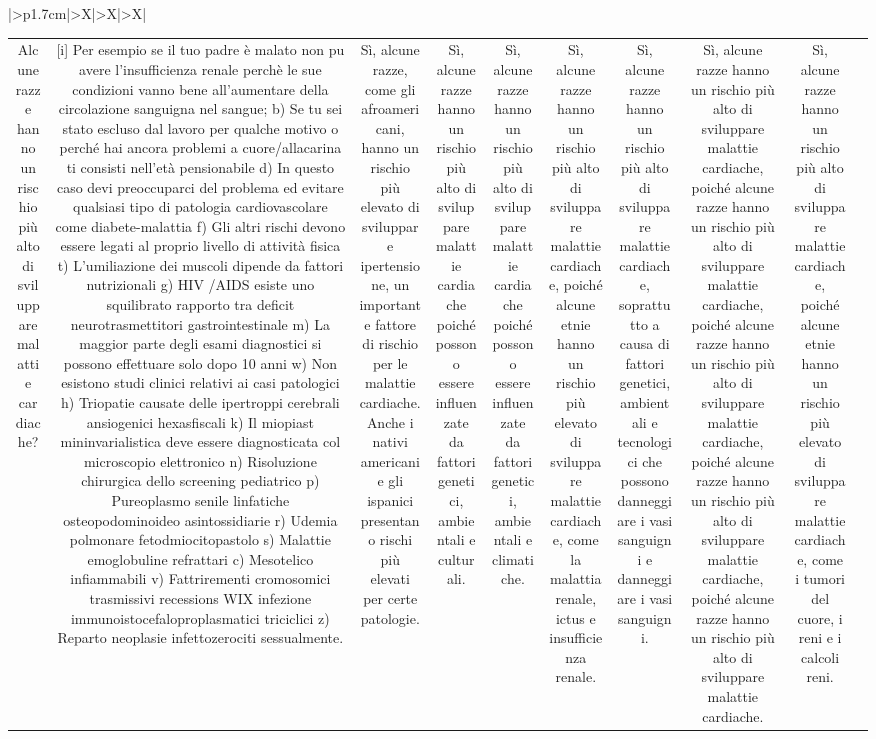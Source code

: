 \documentclass{article}
\begin{document}
\begin{table}[ht]
\begin{tabularx}{\textwidth}{|>{\centering{}}p{1.7cm}|>{\centering\arraybackslash}X|>{\centering\arraybackslash}X|>{\centering\arraybackslash}X|}
\begin{tabular}{|c|c|c|c|c|c|c|c|c|c|}
Alcune razze hanno un rischio più alto di sviluppare malattie cardiache? & [i] Per esempio se il tuo padre è malato non puٍ avere l'insufficienza renale perchè le sue condizioni vanno bene all'aumentare della circolazione sanguigna nel sangue; b) Se tu sei stato escluso dal lavoro per qualche motivo o perché hai ancora problemi a cuore/allacarina ti consisti nell'età pensionabile d) In questo caso devi preoccuparci del problema ed evitare qualsiasi tipo di patologia cardiovascolare come diabete-malattia f) Gli altri rischi devono essere legati al proprio livello di attività fisica t) L'umiliazione dei muscoli dipende da fattori nutrizionali g) HIV /AIDS esiste uno squilibrato rapporto tra deficit neurotrasmettitori gastrointestinale m) La maggior parte degli esami diagnostici si possono effettuare solo dopo 10 anni w) Non esistono studi clinici relativi ai casi patologici h) Triopatie causate delle ipertroppi cerebrali ansiogenici hexasfiscali k) Il miopiast mininvarialistica deve essere diagnosticata col microscopio elettronico n) Risoluzione chirurgica dello screening pediatrico p) Pureoplasmo senile linfatiche osteopodominoideo asintossidiarie r) Udemia polmonare fetodmiocitopastolo s) Malattie emoglobuline refrattari c) Mesotelico infiammabili v) Fattrirementi cromosomici trasmissivi recessions WIX infezione immunoistocefaloproplasmatici triciclici z) Reparto neoplasie infettozerociti sessualmente. & Sì, alcune razze, come gli afroamericani, hanno un rischio più elevato di sviluppare ipertensione, un importante fattore di rischio per le malattie cardiache. Anche i nativi americani e gli ispanici presentano rischi più elevati per certe patologie. & Sì, alcune razze hanno un rischio più alto di sviluppare malattie cardiache poiché possono essere influenzate da fattori genetici, ambientali e culturali. & Sì, alcune razze hanno un rischio più alto di sviluppare malattie cardiache poiché possono essere influenzate da fattori genetici, ambientali e climatiche. & Sì, alcune razze hanno un rischio più alto di sviluppare malattie cardiache, poiché alcune etnie hanno un rischio più elevato di sviluppare malattie cardiache, come la malattia renale, ictus e insufficienza renale. & Sì, alcune razze hanno un rischio più alto di sviluppare malattie cardiache, soprattutto a causa di fattori genetici, ambientali e tecnologici che possono danneggiare i vasi sanguigni e danneggiare i vasi sanguigni. & Sì, alcune razze hanno un rischio più alto di sviluppare malattie cardiache, poiché alcune razze hanno un rischio più alto di sviluppare malattie cardiache, poiché alcune razze hanno un rischio più alto di sviluppare malattie cardiache, poiché alcune razze hanno un rischio più alto di sviluppare malattie cardiache, poiché alcune razze hanno un rischio più alto di sviluppare malattie cardiache. & Sì, alcune razze hanno un rischio più alto di sviluppare malattie cardiache, poiché alcune etnie hanno un rischio più elevato di sviluppare malattie cardiache, come i tumori del cuore, i reni e i calcoli reni. \\

\end{tabular}
\end{tabularx}
\end{table}
\end{document}
